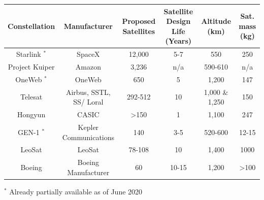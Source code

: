 \bigskip
\begin{center}
\vspace{3mm}
\begin{adjustbox}{width=1\textwidth}
\begin{tabular}{||c| c |c |c |c |c||}
\hline
\textbf{Constellation} & \textbf{Manufacturer} & \textbf{Proposed Satellites} & \textbf{Satellite Design Life (Years)} & \textbf{Altitude (km)} & \textbf{Sat. mass (kg)}\\
\hline \hline 
Starlink $^*$ & SpaceX & 12,000 & 5-7 & 550 & 250 \\
Project Kuiper & Amazon & 3,236 %
& n/a & 590-610 & n/a\\
OneWeb $^*$ & OneWeb & 650 %
& 5 %
& 1,200 & 147\\
Telesat & Airbus, SSTL, SS/ Loral & 292-512 & 10 & 1,000 \& 1,250 & 150\\
Hongyun & CASIC & >150 %
& 1 & 1,100 & 247\\
GEN-1 $^*$ & Kepler Communications & 140 & 3-5 & 520-600 & 12-15 \\ %
LeoSat & LeoSat & 78-108 & 10 & 1,400 & 1000\\
Boeing & Boeing Manufacturer & 60 %
& 10-15 & 1,200 & >100\\

\hline
\end{tabular}
\label{table:internet}
\end{adjustbox}
\end{center}
\footnotesize{$^*$ {\scriptsize Already partially available as of June 2020}}
\bigskip

\normalsize

